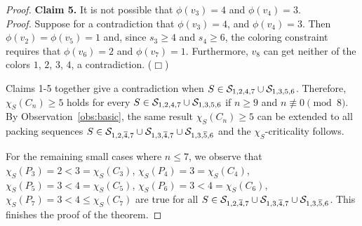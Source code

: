 \documentclass[12pt]{article}
\newcommand{\smallqed}{{\tiny ($\Box$)}}
\newcommand{\cS}{{\cal S}}
\begin{document}
\begin{proof}
\textbf{Claim 5.} It is not possible that $\phi(v_3)=4$ and $\phi(v_4)= 3$.\\
 \noindent \textit{Proof.}
Suppose for a contradiction that $\phi(v_3)=4$, and $\phi(v_4)= 3$. Then  $\phi(v_2)=\phi(v_5)=1$ and, since $s_3 \ge 4$ and $s_4 \ge 6$, the coloring constraint requires that $\phi(v_6)=2$ and $\phi(v_7)=1$. Furthermore, $v_8$ can get neither of the colors $1$, $2$, $3$, $4$, a contradiction. \smallqed
\medskip

Claims 1-5 together give a contradiction when $S \in \cS_{1,2,4,7} \cup \cS_{1,3,5,6}$. Therefore, $\chi_S(C_n) \ge 5$ holds for every $S \in \cS_{1,2,4,7} \cup \cS_{1,3,5,6}$ if $n \ge 9$ and $n \not\equiv 0 \pmod{8}$.
By Observation~\ref{obs:basic}, the same result $\chi_S(C_n) \ge 5$ can be extended to all packing sequences $S \in \mathcal{S}_{1,2,\overline{4},7} \cup \cS_{1,3,\overline{4},7} \cup \cS_{1,3,\overline{5}, 6}$ and the $\chi_S$-criticality follows.
\medskip


For the remaining small cases where $n \le 7$, we observe that
$\chi_S(P_3)=2 < 3= \chi_S(C_3)$,
$\chi_S(P_4)=3=\chi_S(C_4)$,
$\chi_S(P_5)=3 < 4 = \chi_S(C_5)$,
$\chi_S(P_6)=3 < 4 = \chi_S(C_6)$,
$\chi_S(P_7)=3 < 4 \le \chi_S(C_7)$ are true for all $S \in \mathcal{S}_{1,2,\overline{4},7} \cup \cS_{1,3,\overline{4},7} \cup \cS_{1,3,\overline{5}, 6}$. This finishes the proof of the theorem.
    \end{proof}
 
\end{document}
